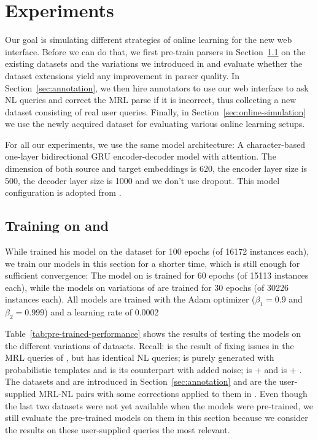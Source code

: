 \chapter{Experiments}
\label{ch:experiments}

Our goal is simulating different strategies of online learning for the new web
interface. Before we can do that, we first pre-train parsers in
Section~\ref{sec:pre-training} on the existing datasets \nlmapstwo{} and the
variations we introduced in \nlmapsthree{} and evaluate whether the dataset
extensions yield any improvement in parser quality. In
Section~\ref{sec:annotation}, we then hire annotators to use our web interface
to ask NL queries and correct the MRL parse if it is incorrect, thus collecting
a new dataset consisting of real user queries. Finally, in
Section~\ref{sec:online-simulation} we use the newly acquired dataset for
evaluating various online learning setups.

For all our experiments, we use the same model architecture: A character-based
one-layer bidirectional GRU encoder-decoder \parencite{cho-2014} model with
attention.\parencite{bahdanau-2015} The dimension of both source and target
embeddings is 620, the encoder layer size is 500, the decoder layer size is 1000
and we don’t use dropout. This model configuration is adopted from
\textcite{staniek-2020}.

\section{Training on \nlmapstwo{} and \nlmapsthree{}}
\label{sec:pre-training}

While \textcite{staniek-2020} trained his model on the \nlmapstwo{} dataset for
100 epochs (of 16172 instances each), we train our models in this section for a
shorter time, which is still enough for sufficient convergence: The model on
\nlmapstwoone{} is trained for 60 epochs (of 15113 instances each), while the
models on variations of \nlmapsthree{} are trained for 30 epochs (of 30226
instances each). All models are trained with the Adam optimizer (\(\beta_1 =
0.9\) and \(\beta_2 = 0.999\)) and a learning rate of \num{0.0002}

Table~\ref{tab:pre-trained-performance} shows the results of testing the models
on the different variations of \nlmaps{} datasets. Recall: \nlmtwoone{} is the
result of fixing issues in the MRL queries of \nlmtwo{}, but has identical NL
queries; \nlmthreea{} is purely generated with probabilistic templates and
\nlmthreeb{} is its counterpart with added noise; \nlmthreenormal{} is
\nlmtwoone{} + \nlmthreea{} and \nlmthree{} is \nlmtwoone{} + \nlmthreeb{}. The
datasets \nlmfourraw{} and \nlmfour{} are introduced in
Section~\ref{sec:annotation} and are the user-supplied MRL-NL pairs with some
corrections applied to them in \nlmfour{}. Even though the last two datasets
were not yet available when the models were pre-trained, we still evaluate the
pre-trained models on them in this section because we consider the results on
these user-supplied queries the most relevant.

